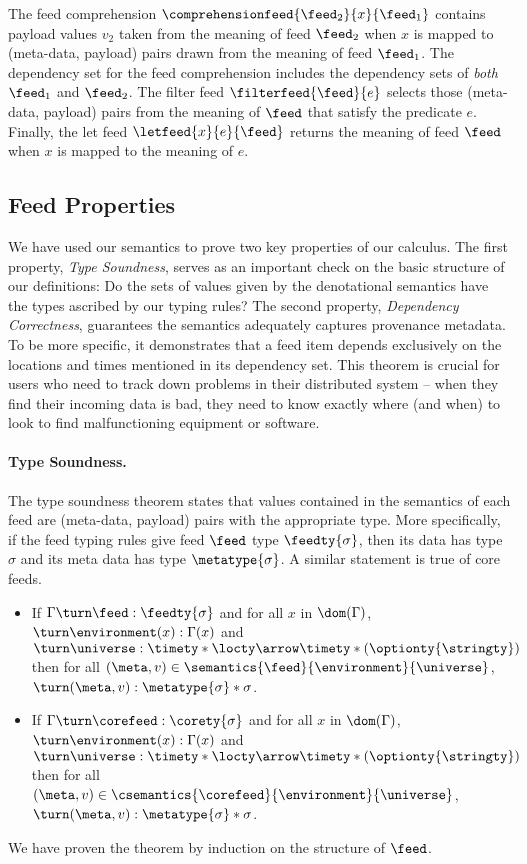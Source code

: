 The feed comprehension $\comprehensionfeed{\feed_2}{x}{\feed_1}$
contains payload values $v_2$ taken from the meaning of feed $\feed_2$
when $x$ is mapped to (meta-data, payload) pairs drawn from the meaning
of feed $\feed_1$.  The dependency set for the feed
comprehension includes the dependency sets of {\em both} $\feed_1$ and
$\feed_2$. 
The filter feed $\filterfeed{\feed}{e}$ selects those
(meta-data, payload) pairs from 
the meaning of $\feed$  that satisfy the predicate $e$.
Finally, the let feed $\letfeed{x}{e}{\feed}$ returns the meaning
of feed $\feed$ when $x$ is mapped to the meaning of $e$. 

\subsection{Feed Properties}
We have used our semantics to prove two key properties of our calculus.
The first property, {\em Type Soundness}, serves as an important check
on the basic structure of our definitions:  Do the sets of values given
by the denotational semantics have the types ascribed by our typing rules?
The second property, {\em Dependency Correctness}, guarantees the semantics
adequately captures provenance metadata.  To be more specific, it demonstrates
that a feed item depends exclusively on the locations and times mentioned
in its dependency set.  This theorem is crucial for users who need to
track down problems in their distributed system -- when they find their
incoming data is bad, they need to know exactly where (and when) to look 
to find malfunctioning equipment or software.

\paragraph*{Type Soundness.}
The type soundness theorem states that values
contained in the semantics of each feed are (meta-data, payload) pairs
with the appropriate type.  More specifically, if the feed typing
rules give feed $\feed$ type $\feedty{\sigma}$, 
then its data has type $\sigma$ and its meta data has type $\metatype{\sigma}$.
A similar statement is true of core feeds.

\begin{theorem}
\begin{itemize}
\item If $\Gamma \turn \feed : \feedty{\sigma}$ and
for all $x$ in $\dom(\Gamma)$, $\turn \environment(x) : \Gamma(x)$
and $\turn \universe : \timety * \locty \arrow \timety * (\optionty{\stringty})$
then
for all $(\meta,v) \in \semantics{\feed}{\environment}{\universe}$,
$\turn (\meta,v) : \metatype{\sigma} * \sigma$. 
\item If $\Gamma \turn \corefeed : \corety{\sigma}$ and
for all $x$ in $\dom(\Gamma)$, $\turn \environment(x) : \Gamma(x)$
and $\turn \universe : \timety * \locty \arrow \timety * (\optionty{\stringty})$
then
for all $(\meta,v) \in \csemantics{\corefeed}{\environment}{\universe}$,
$\turn (\meta,v) : \metatype{\sigma} * \sigma$. 
\end{itemize}
\end{theorem}
\noindent
We have proven the theorem by induction on the structure of $\feed$.

